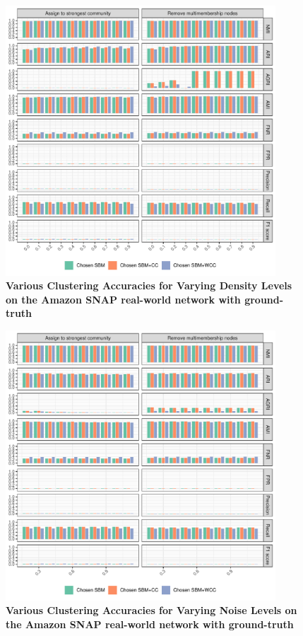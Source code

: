 \documentclass[aps,pre,superscriptaddress]{article}
\begin{document}
\begin{figure}[!htpb]
	\centering
	\includegraphics[width=0.9\textwidth]{figures/density_amazon_accuracy.pdf}
	\caption[]{\textbf{Various Clustering Accuracies for Varying Density Levels on the Amazon SNAP real-world network with ground-truth}}
	\label{fig:density-amazon-acuracy}
\end{figure}

\begin{figure}[!htpb]
	\centering
	\includegraphics[width=0.9\textwidth]{figures/noise_amazon_accuracy.pdf}
	\caption[]{\textbf{Various Clustering Accuracies for Varying Noise Levels on the Amazon SNAP real-world network with ground-truth}}
	\label{fig:noise-amazon-acuracy}
\end{figure}
\end{document}

